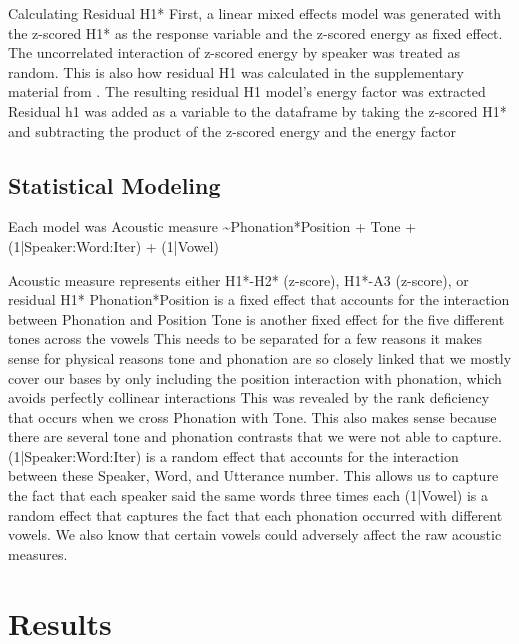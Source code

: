 \documentclass[12pt, letterpaper]{article}
\begin{document}
Calculating Residual H1*
First, a linear mixed effects model was generated with the z-scored H1* as the response variable and the z-scored energy as fixed effect. 
The uncorrelated interaction of z-scored energy by speaker was treated as random. 
This is also how residual H1 was calculated in the supplementary material from \citet{chaiH1H2Acoustic2022}.
The resulting residual H1 model’s energy factor was extracted
Residual h1 was added as a variable to the dataframe by taking the z-scored H1* and subtracting the product of the z-scored energy and the energy factor 

\subsection{Statistical Modeling} \label{sec:Statistics}

Each model was Acoustic measure \sim  Phonation*Position + Tone + (1|Speaker:Word:Iter) + (1|Vowel)

Acoustic measure represents either H1*-H2* (z-score), H1*-A3 (z-score), or residual H1* 
Phonation*Position is a fixed effect that accounts for the interaction between Phonation and Position
Tone is another fixed effect for the five different tones across the vowels
This needs to be separated for a few reasons
it makes sense for physical reasons
tone and phonation are so closely linked that we mostly cover our bases by only including the position interaction with phonation, which avoids perfectly collinear interactions
This was revealed by the rank deficiency that occurs when we cross Phonation with Tone. 
This also makes sense because there are several tone and phonation contrasts that we were not able to capture.
(1|Speaker:Word:Iter) is a random effect that accounts for the interaction between these Speaker, Word, and Utterance number.
This allows us to capture the fact that each speaker said the same words three times each 
(1|Vowel) is a random effect that captures the fact that each phonation occurred with different vowels. 
We also know that certain vowels could adversely affect the raw acoustic measures.

\section{Results} \label{sec:Results}

\end{document}
